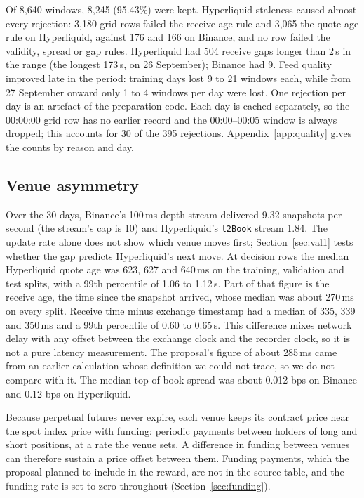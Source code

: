 \documentclass[12pt,a4paper]{article}
\DeclareRobustCommand{\bps}{\ifmmode\,\text{bps}\else\,bps\fi}
\begin{document}
Of 8,640 windows, 8,245 (95.43\%) were kept. Hyperliquid staleness caused almost every
rejection: 3,180 grid rows failed the receive-age rule and 3,065 the quote-age rule on
Hyperliquid, against 176 and 166 on Binance, and no row failed the validity, spread or gap
rules. Hyperliquid had 504 receive gaps longer than 2\,s in the range (the longest 173\,s,
on 26 September); Binance had 9. Feed quality improved late in the period: training days
lost 9 to 21 windows each, while from 27 September onward only 1 to 4 windows per day were
lost. One rejection per day is an artefact of the preparation code. Each day is cached
separately, so the 00:00:00 grid row has no earlier record and the 00:00--00:05 window is
always dropped; this accounts for 30 of the 395 rejections. Appendix~\ref{app:quality}
gives the counts by reason and day.

\subsection{Venue asymmetry}\label{sec:asym}
Over the 30 days, Binance's 100\,ms depth stream delivered 9.32 snapshots per second (the
stream's cap is 10) and Hyperliquid's \texttt{l2Book} stream 1.84. The update rate alone does
not show which venue moves first; Section~\ref{sec:val1} tests whether the gap predicts
Hyperliquid's next move. At decision rows the median Hyperliquid quote age was 623, 627 and
640\,ms on the training, validation and test splits, with a 99th percentile of 1.06 to
1.12\,s. Part of that figure is the receive age, the time since the snapshot arrived, whose
median was about 270\,ms on every split. Receive time minus exchange timestamp had a
median of 335, 339 and 350\,ms and a 99th percentile of 0.60 to 0.65\,s. This difference
mixes network delay with any offset between the exchange clock and the recorder clock, so it
is not a pure latency measurement. The proposal's figure of about 285\,ms came from an
earlier calculation whose definition we could not trace, so we do not compare with it. The
median top-of-book spread was about 0.012\bps{} on Binance and 0.12\bps{} on Hyperliquid.

Because perpetual futures never expire, each venue keeps its contract price near the spot
index price with funding: periodic payments between holders of long and short positions, at
a rate the venue sets. A difference in funding between venues can therefore sustain a price
offset between them. Funding payments, which the proposal planned to include in the reward, are not in the
source table, and the funding rate is set to zero throughout (Section~\ref{sec:funding}).
\end{document}
